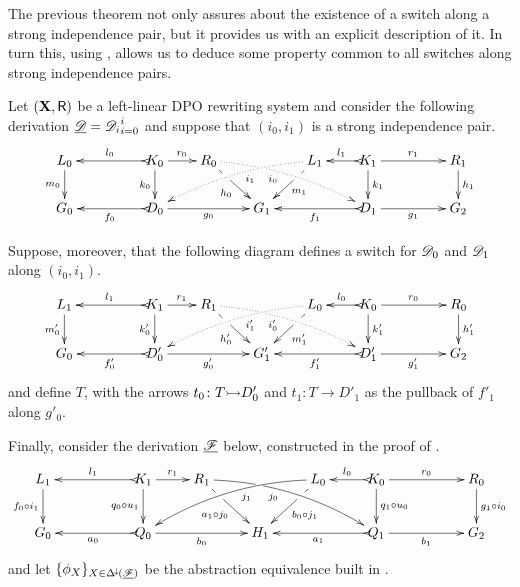 The previous theorem not only assures about the existence of a switch along a strong independence pair, but it provides us with an explicit description of it. In turn this, using , allows us to deduce some property common to all switches along strong independence pairs.  

\begin{lemma}\label{cor:strongip}
	Let $(\textbf {\textup{X}}, \mathsf{R})$ be a left-linear DPO rewriting system and consider the following derivation $\underline{\mathscr{D}}={\mathscr{D}_{i}}_{i=0}^i$ and suppose that $(i_0, i_1)$ is a strong independence pair.
	\[\xymatrix@R=20pt@C=20pt{L_0 \ar[d]_{m_0}&& K_0
		\ar[d]_{k_0}\ar@{>->}[ll]_{l_0} \ar[r]^{r_0} & R_0
		\ar@{.>}@/^.25cm/[drrr]|(.32)\hole_(.4){i_0}
		\ar[dr]|(.33)\hole_{h_0} && L_1 \ar@{.>}@/_.25cm/[dlll]^(.4){i_1}
		\ar[dl]|(.33)\hole^{m_1}& K_1 \ar[d]^{k_1}\ar@{>->}[l]_{l_1}
		\ar[rr]^{r_1} && R_1 \ar[d]^{h_1}\\G_0 && \ar@{>->}[ll]^{f_0}
		D_0 \ar[rr]_{g_0}&& G_1 && \ar@{>->}[ll]^{f_1} D_1
		\ar[rr]_{g_1}&& G_2}
	\]
	
	Suppose, moreover, that the following diagram defines a switch for $\mathscr{D}_0$ and $\mathscr{D}_1$ along $(i_0, i_1)$. 	
	\[
	\xymatrix@R=20pt@C=20pt{
		{L_1} \ar[d]_{m_0'}
		&&  {K_1} \ar@{>->}[ll]_{l_1} \ar[r]^{r_1} \ar[d]_{k_0'}
		&  {R_1} \ar[dr]|(.33)\hole_{h_0'}  \ar@/^.25cm/@{.>}_(.4){i_0'}|(.32)\hole[drrr]
		& & 
		{L_0}\ar[dl]|(.33)\hole^{m_1'} \ar@/_.25cm/@{.>}^(.4){i_1'}[dlll] 
		&  {K_0} \ar@{>->}[l]_{l_0} \ar[rr]^{r_0} \ar[d]^{k_1'}
		& & {R_0} \ar[d]^{h_1'} \\		
		{G_0}
		& & {D_0'} \ar@{>->}[ll]^{f_0'} \ar[rr]_{g_0'}
		& &  {G'_1} 
		& &  {D_1'} \ar@{>->}[ll]^{f_1'} \ar[rr]_{g_1'}
		& & {G_2}  }
	\]
and define $T$, with the arrows $t_0\colon T\mto D'_0$ and $t_1\colon T\to D'_1$ as the pullback of $f'_1$ along $g'_0$.


Finally, consider the derivation $\underline{\mathscr{F}}$ below, constructed in the proof of . 
\[\xymatrix{L_1 \ar[d]_{f_0 \circ i_1}&& K_1
	\ar[d]_{q_0\circ u_1}\ar@{>->}[ll]_{l_1} \ar[r]^{r_1} & R_1
	\ar@/^.35cm/[drrr]|(.31)\hole_(.4){j_0} \ar[dr]|(.3)\hole_{a_1\circ
		j_0} && L_0 \ar@/_.35cm/[dlll]^(.4){j_1} \ar[dl]|(.3)\hole^{b_0\circ
		j_1}& K_0\ar[d]^{q_1\circ u_0}\ar@{>->}[l]_{l_0} \ar[rr]^{r_0} && R_0
	\ar[d]^{g_1\circ i_0} \\G_0 && \ar@{>->}[ll]^{a_0} Q_0 \ar[rr]_{b_0}&&
	H_1 && \ar@{>->}[ll]^{a_1} Q_1 \ar[rr]_{b_1}&& G_2}\]
and let $\{\phi_{X}\}_{X\in \Delta^{\hspace{-1pt}\downarrow\hspace{-1pt}}(\underline{\mathscr{F}})}$ be the abstraction equivalence built in .


\end{lemma}
